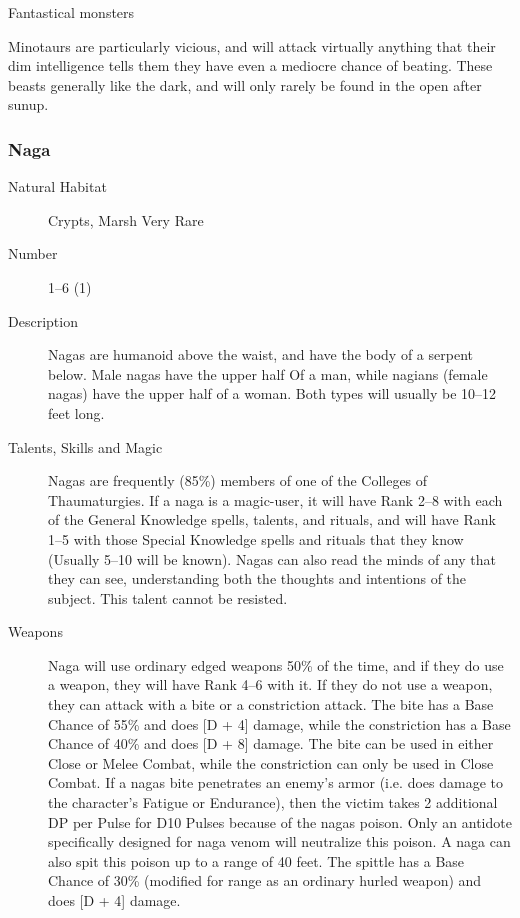 \begin{mmgroup}{Fantastical monsters}
\begin{mmcomment}
  Minotaurs are particularly vicious, and will attack
virtually anything that their dim intelligence tells them they have
even a mediocre chance of beating. These beasts generally like
the dark, and will only rarely be found in the open after sunup.

\end{mmcomment}

\subsubsection{Naga}

\begin{description}
\item[Natural Habitat] Crypts, Marsh  Very Rare

\item[Number] 1–6 (1)

\item[Description]  Nagas are humanoid above the waist, and have
the body of a serpent below. Male nagas have the upper half Of
a man, while nagians (female nagas) have the upper half of a
woman. Both types will usually be 10–12 feet long.

\item[Talents, Skills and Magic] Nagas are frequently (85\%) members of one of the Colleges of
Thaumaturgies. If a naga is a magic-user, it will have Rank 2–8 with
each of the General Knowledge spells, talents, and rituals, and will
have Rank 1–5 with those Special Knowledge spells and rituals that
they know (Usually 5–10 will be known). Nagas can also read the minds
of any that they can see, understanding both the thoughts and
intentions of the subject. This talent cannot be resisted.

\item[Weapons] Naga will use ordinary edged weapons 50\% of the time, and if
they do use a weapon, they will have Rank 4–6 with it. If they do not
use a weapon, they can attack with a bite or a constriction
attack. The bite has a Base Chance of 55\% and does [D + 4] damage,
while the constriction has a Base Chance of 40\% and does [D + 8]
damage. The bite can be used in either Close or Melee Combat, while
the constriction can only be used in Close Combat. If a nagas bite
penetrates an enemy's armor (i.e. does damage to the character's
Fatigue or Endurance), then the victim takes 2 additional DP per Pulse
for D10 Pulses because of the nagas poison. Only an antidote
specifically designed for naga venom will neutralize this poison. A
naga can also spit this poison up to a range of 40 feet. The spittle
has a Base Chance of 30\% (modified for range as an ordinary hurled
weapon) and does [D + 4] damage.


\end{description}
\end{mmgroup}
